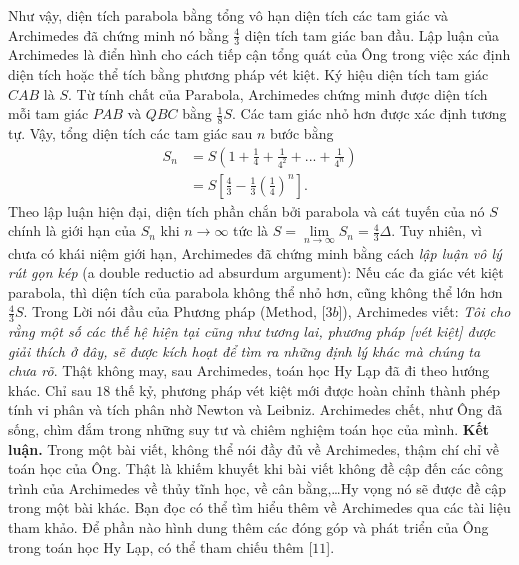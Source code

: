 \begin{multicols}{2}
\begin{figure}[H]
		\vspace*{-15pt}
	\end{figure}
	Như vậy, diện tích parabola bằng tổng vô hạn diện tích các tam giác và Archimedes đã chứng minh nó bằng $\frac{4}{3}$  diện tích tam giác ban đầu.   
	\vskip 0.1cm
	Lập luận của Archimedes là điển hình cho cách tiếp cận tổng quát của Ông trong việc xác định diện tích hoặc thể tích bằng phương pháp vét kiệt.  Ký hiệu diện tích tam giác $CAB$ là $S$.  Từ tính chất của Parabola, Archimedes chứng minh được diện tích mỗi tam giác $PAB$  và $QBC$  bằng $\frac{1}{8}S$.  Các tam giác nhỏ hơn được xác định tương tự. Vậy, tổng diện tích các tam giác sau $n$  bước bằng
	\begin{align*}
		{S_n} &= S\left( {1 + \frac{1}{4} + \frac{1}{{{4^2}}} + ... + \frac{1}{{{4^n}}}} \right) \\
		&= S\left[ {\frac{4}{3} - \frac{1}{3}{{\left( {\frac{1}{4}} \right)}^n}} \right].
	\end{align*}
	Theo lập luận hiện đại, diện tích phần chắn bởi parabola và cát tuyến của nó $S$  chính là giới hạn của $S_n$  khi $n \to \infty$  tức là  $S = \mathop {\lim }\limits_{n \to \infty } {S_n} = \frac{4}{3}\Delta .$
	\vskip 0.1cm
	Tuy nhiên, vì chưa có khái niệm giới hạn, Archimedes đã chứng minh bằng cách \textit{lập luận vô lý rút gọn kép} (a double reductio ad absurdum argument): Nếu các đa giác vét kiệt parabola, thì diện tích của parabola không thể nhỏ hơn, cũng không thể lớn hơn $\frac{4}{3}S.$
	\vskip 0.1cm  
	Trong Lời nói đầu của Phương pháp (Method, [$3b$]), Archimedes viết: \textit{Tôi cho rằng một số các thế hệ hiện tại cũng như tương lai, phương pháp [vét kiệt] được giải thích ở đây, sẽ được kích hoạt để tìm ra những định lý khác mà chúng ta chưa rõ}. Thật không may, sau Archimedes, toán học Hy Lạp đã đi theo hướng khác.  Chỉ sau $18$ thế kỷ, phương pháp vét kiệt mới được hoàn chỉnh thành phép tính vi phân và tích phân nhờ Newton và Leibniz. 
	\vskip 0.1cm
	Archimedes chết, như Ông đã sống, chìm đắm trong những suy tư và chiêm nghiệm toán học của mình. 
	\vskip 0.1cm
	\textbf{\color{lichsutoanhoc}Kết luận.} Trong một bài viết, không thể nói đầy đủ về Archimedes, thậm chí chỉ về toán học của Ông. Thật là khiếm khuyết khi bài viết không đề cập đến các công trình của Archimedes về thủy tĩnh học, về cân bằng,\ldots Hy vọng nó sẽ được đề cập trong một bài khác. 
	\vskip 0.1cm
	Bạn đọc có thể tìm hiểu thêm về Archimedes qua các tài liệu tham khảo. Để phần nào hình dung thêm các đóng góp và phát triển của Ông trong toán học Hy Lạp, có thể tham chiếu thêm [$11$].

\end{multicols}
